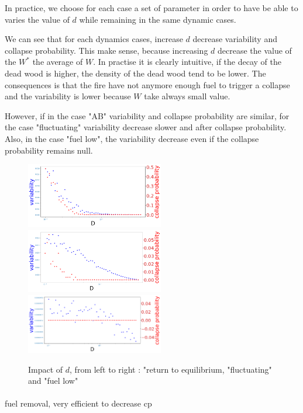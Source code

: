\documentclass{article}
\begin{document}
In practice, we choose for each case a set of parameter in order to have be able to varies the value of $d$ while remaining in the same dynamic cases.

We can see that for each dynamics cases, increase $d$ decrease variability and collapse probability. This make sense, because increasing $d$ decrease the value of the $W^*$ the average of $W$. In practise it is clearly intuitive, if the decay of the dead wood is higher, the density of the dead wood tend to be lower. The consequences is that the fire have not anymore enough fuel to trigger a collapse and the variability is lower because $W$ take always small value.

However, if in the case "AB" variability and collapse probability are similar, for the case "fluctuating" variability decrease slower and after collapse probability. Also, in the case "fuel low", the variability decrease even if the collapse probability remains null.



\begin{figure}[h]
\begin{center}
\includegraphics[width=6cm]{results/return_to_equilibrium_1.png}
\includegraphics[width=6cm]{results/equivalent_1.png}
\includegraphics[width=6cm]{results/fuel_low_1.png}
\end{center}
\caption{\label{fig:temp}Impact of $d$, from left to right : "return to equilibrium, "fluctuating" and "fuel low"}
\end{figure}


\paragraph{}
fuel removal, very efficient to decrease cp
\end{document}
